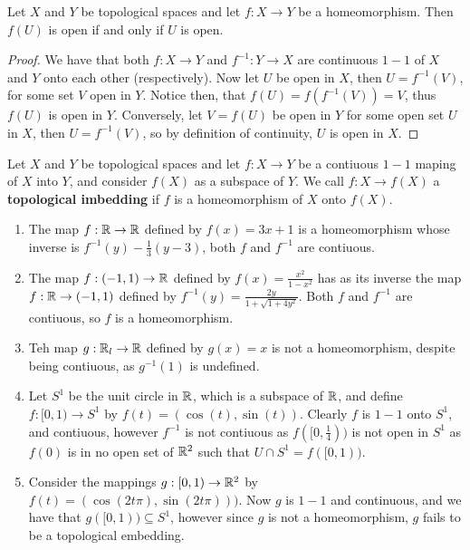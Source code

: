 \begin{lemma}\label{1.7.2} 
    Let $X$ and  $Y$ be topological spaces and let $f:X \rightarrow Y$ be a homeomorphism. Then
    $f(U)$ is open if and only if $U$ is open.
\end{lemma}
\begin{proof}
    We have that both $f:X \rightarrow Y$ and  $f^{-1}:Y \rightarrow X$ are continuous $1-1$ of $X$
    and  $Y$ onto each other  (respectively). Now let $U$ be open in  $X$, then $U=f^{-1}(V)$, for 
    some set  $V$ open in $Y$. Notice then, that $f(U)=f(f^{-1}(V))=V$, thus $f(U)$ is open in $Y$. 
    Conversely, let $V=f(U)$ be open in $Y$ for some open set  $U$ in  $X$, then  $U=f^{-1}(V)$, so
    by definition of continuity, $U$  is open in $X$.
\end{proof}

\begin{definition}
    Let $X$ and  $Y$ be topological spaces and let  $f:X \rightarrow Y$ be a contiuous  $1-1$ maping
    of  $X$ into  $Y$, and consider  $f(X)$ as a subspace of $Y$. We call  $f:X \rightarrow f(X)$ a
    \textbf{topological imbedding} if $f$ is a homeomorphism of $X$ onto  $f(X)$.
\end{definition}

\begin{example}
    \begin{enumerate}[label=(\arabic*)]
        \item The map $f:\mathbb{R} \rightarrow \mathbb{R}$ defined by  $f(x)=3x+1$ is a homeomorphism whose inverse
            is $f^{-1}(y)-\frac{1}{3}(y-3)$, both $f$ and  $f^{-1}$ are contiuous.

        \item The map $f:(-1,1) \rightarrow \mathbb{R}$ defined by $f(x)=\frac{x^2}{1-x^2}$ has as its
            inverse the map $f:\mathbb{R} \rightarrow (-1,1)$ defined by
            $f^{-1}(y)=\frac{2y}{1+\sqrt{1+4y^2}}$. Both $f$ and  $f^{-1}$ are contiuous, so $f$ is
            a homeomorphism.

        \item Teh map  $g:\mathbb{R}_l \rightarrow \mathbb{R}$ defined by  $g(x)=x$ is not a homeomorphism, despite
            being contiuous, as $g^{-1}(1)$ is undefined.

        \item Let $S^1$ be the unit circle in $\mathbb{R}$, which is a subspace of $\mathbb{R}$, and define
            $f:[0,1) \rightarrow S^1$ by $f(t)=(\cos(t),\sin(t))$. Clearly $f$ is  $1-1$ onto
            $S^1$, and contiuous, however  $f^{-1}$ is not contiuous as $f([0,\frac{1}{4}))$ is not
            open in $S^1$ as  $f(0)$ is in no open set of $\mathbb{R}^2$ such that  $U \cap S^1=f([0,1))$.

        \item Consider the mappings $g:[0,1) \rightarrow \mathbb{R}^2$ by $f(t)=(\cos(2t\pi),\sin(2t\pi)))$.
            Now $g$ is  $1-1$ and continuous, and we have that  $g([0,1)) \subseteq S^1$, however
            since $g$ is not a homeomorphism,  $g$ fails to be a topological embedding.
    \end{enumerate}
\end{example} 

